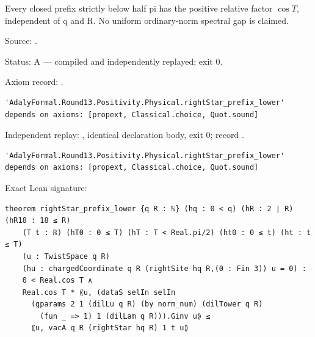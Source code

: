 \begin{theorem}[bp-497]
\label{bp-497}
\leanok
Every closed prefix strictly below half pi has the positive relative factor \(\cos T\), independent of q and R. No uniform ordinary-norm spectral gap is claimed.

\par Source: \texttt{}.
\par Status: A — compiled and independently replayed; exit 0.
\par Axiom record: \texttt{}.
\begin{verbatim}
'AdalyFormal.Round13.Positivity.Physical.rightStar_prefix_lower' depends on axioms: [propext, Classical.choice, Quot.sound]
\end{verbatim}
\par Independent replay: \texttt{}, identical declaration body, exit 0; record \texttt{}.
\begin{verbatim}
'AdalyFormal.Round13.Positivity.Physical.rightStar_prefix_lower' depends on axioms: [propext, Classical.choice, Quot.sound]
\end{verbatim}
\par Exact Lean signature:
\begin{verbatim}
theorem rightStar_prefix_lower {q R : ℕ} (hq : 0 < q) (hR : 2 ∣ R) (hR18 : 18 ≤ R)
    (T t : ℝ) (hT0 : 0 ≤ T) (hT : T < Real.pi/2) (ht0 : 0 ≤ t) (ht : t ≤ T)
    (u : TwistSpace q R)
    (hu : chargedCoordinate q R (rightSite hq R,(0 : Fin 3)) u = 0) :
    0 < Real.cos T ∧
    Real.cos T * ⟪u, (dataS selIn selIn
      (gparams 2 1 (dilLu q R) (by norm_num) (dilTower q R)
        (fun _ => 1) 1 (dilLam q R))).Ginv u⟫ ≤
      ⟪u, vacA q R (rightStar hq R) 1 t u⟫
\end{verbatim}
\end{theorem}

